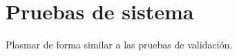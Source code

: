 \section{\forlnameref Pruebas de sistema}
\label{sec:systemTests}

\begin{shaded}
Plasmar de forma similar a las pruebas de validación.
\end{shaded}